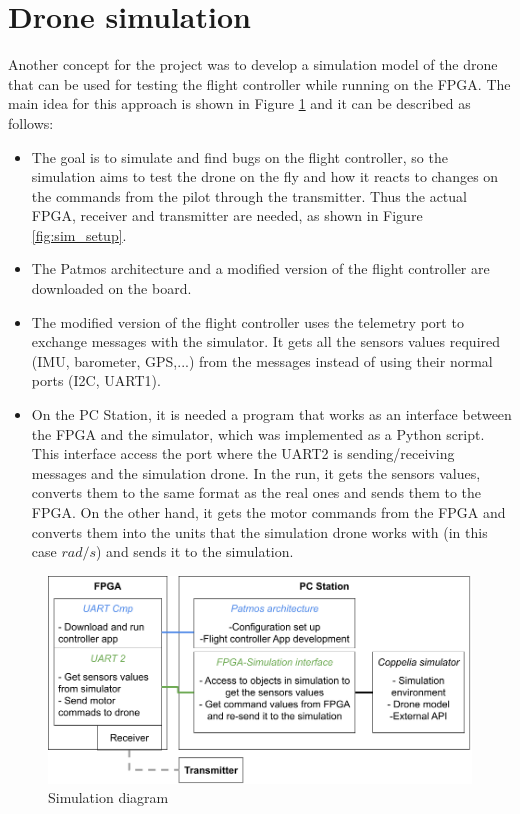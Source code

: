 \section{Drone simulation}\label{sec:simulation}

Another concept for the project was to develop a simulation model of the drone that can be used for testing the flight controller while running on the FPGA. The main idea for this approach is shown in Figure \ref{fig:sim_concept} and it can be described as follows:

\begin{itemize}
    \item The goal is to simulate and find bugs on the flight controller, so the simulation aims to test the drone on the fly and how it reacts to changes on the commands from the pilot through the transmitter. Thus the actual FPGA, receiver and transmitter are needed, as shown in Figure \ref{fig:sim_setup}.
    
    \item The Patmos architecture and a modified version of the flight controller are downloaded on the board.
    
    \item The modified version of the flight controller uses the telemetry port to exchange messages with the simulator. It gets all the sensors values required (IMU, barometer, GPS,...) from the messages instead of using their normal ports (I2C, UART1).
    
    \item On the PC Station, it is needed a program that works as an interface between the FPGA and the simulator, which was implemented as a Python script. This interface access the port where the UART2 is sending/receiving messages and the simulation drone. In the run, it gets the sensors values, converts them to the same format as the real ones and sends them to the FPGA. On the other hand, it gets the motor commands from the FPGA and converts them into the units that the simulation drone works with (in this case $rad/s$) and sends it to the simulation.
    
\end{itemize}

\begin{figure} [H]
    \centering
    \includegraphics[width=\textwidth]{Figures/simulation/simulation_concept.png}
    \caption{Simulation diagram}
    \label{fig:sim_concept}
\end{figure}

